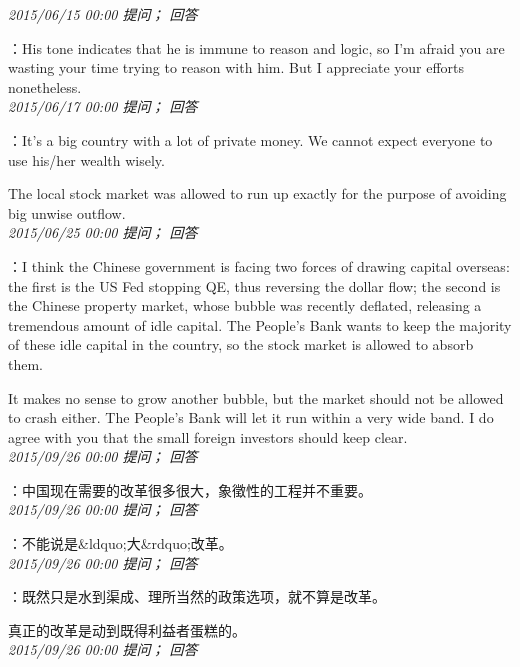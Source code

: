 \documentclass[twocolumn]{ctexart}
\begin{document}
\textit{\hfill\noindent\small 2015/06/15 00:00 提问； 回答}

：His tone indicates that he is immune to reason and logic, so I'm afraid you are wasting your time trying to reason with him. But I appreciate your efforts nonetheless.\\

\textit{\hfill\noindent\small 2015/06/17 00:00 提问； 回答}

：It's a big country with a lot of private money. We cannot expect everyone to use his/her wealth wisely.

The local stock market was allowed to run up exactly for the purpose of avoiding big unwise outflow.\\

\textit{\hfill\noindent\small 2015/06/25 00:00 提问； 回答}

：I think the Chinese government is facing two forces of drawing capital overseas: the first is the US Fed stopping QE, thus reversing the dollar flow; the second is the Chinese property market, whose bubble was recently deflated, releasing a tremendous amount of idle capital. The People's Bank wants to keep the majority of these idle capital in the country, so the stock market is allowed to absorb them.

It makes no sense to grow another bubble, but the market should not be allowed to crash either. The People's Bank will let it run within a very wide band. I do agree with you that the small foreign investors should keep clear.
\\

\textit{\hfill\noindent\small 2015/09/26 00:00 提问； 回答}

：中国现在需要的改革很多很大，象徵性的工程并不重要。\\

\textit{\hfill\noindent\small 2015/09/26 00:00 提问； 回答}

：不能说是\&ldquo;大\&rdquo;改革。\\

\textit{\hfill\noindent\small 2015/09/26 00:00 提问； 回答}

：既然只是水到渠成、理所当然的政策选项，就不算是改革。

真正的改革是动到既得利益者蛋糕的。\\

\textit{\hfill\noindent\small 2015/09/26 00:00 提问； 回答}
\end{document}
